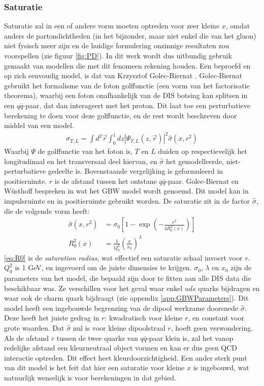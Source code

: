 \documentclass[a4paper,11pt]{article}
\numberwithin{equation}{section} %
\begin{document}
    \subsubsection{Saturatie} \label{sec:Saturatie}
Saturatie zal in een of andere vorm moeten optreden voor zeer kleine $x$, omdat anders de partondichtheden (in het bijzonder, maar niet enkel die van het gluon) niet fysisch meer zijn en de huidige formulering onzinnige resultaten zou voorspellen (zie figuur \ref{fig:PD}).
In dit werk wordt dus uitbundig gebruik gemaakt van modellen die met dit fenomeen rekening houden.
Een beproefd en op zich eenvoudig model, is dat van Krzysztof Golec-Biernat \cite{GB}.
Golec-Biernat gebruikt het formalisme van de foton golffunctie (een vorm van het factorisatie theorema), waarbij een foton onafhankelijk van de DIS botsing kan splitsen in een $q\bar{q}$-paar, dat dan interageert met het proton.
Dit laat toe een perturbatieve berekening te doen voor deze golffunctie, en de rest wordt beschreven door middel van een model.
\begin{align}
\sigma_{T,L} = \int d^2 \vec{r} \int_0^1 dz |\Psi_{T,L} (z, \vec{r})|^2 \hat{\sigma} (x,r^2)
\end{align}
Waarbij $\Psi$ de golffunctie van het foton is, $T$ en $L$ duiden op respectievelijk het longitudinaal en het transversaal deel hiervan, en $\hat{\sigma}$ het gemodelleerde, niet-perturbatieve gedeelte is.
Bovenstaande vergelijking is geformuleerd in positieruimte.
$r$ is de afstand tussen het ontstane $q\bar{q}$-paar.
Golec-Biernat en Wüsthoff bespreken in \cite{GBW} wat het GBW model wordt genoemd.
Dit model kan in impulsruimte en in positieruimte gebruikt worden.
De saturatie zit in de factor $\hat{\sigma}$, die de volgende vorm heeft:
\begin{align}
\hat{\sigma}(x,r^2) &= \sigma_0 \left[ 1- \exp{\left(-\frac{r^2}{4 R_0^2(x)}\right)} \right] \\
R_0^2(x) &= \frac{1}{Q_0^2} \left( \frac{x}{x_0} \right)^\lambda \label{eq:R0}
\end{align}
\eqref{eq:R0} is de \textit{saturation radius}, wat effectief een saturatie schaal invoert voor $r$.
$Q_0^2$ is 1 GeV, en ingevoerd om de juiste dimensies te krijgen.
$\sigma_0$, $\lambda$ en $x_0$ zijn de parameters van het model, die bepaald zijn door te fitten aan alle DIS data die beschikbaar was.
Ze verschillen voor het geval waar enkel $uds$ quarks bijdragen en waar ook de charm quark bijdraagt (zie appendix \ref{app:GBWParameters}).
Dit model heeft een ingebouwde begrenzing van de dipool werkzame doorsnede $\hat{\sigma}$.
Deze heeft het juiste gedrag in $r$: kwadratisch voor kleine $r$, en constant voor grote waarden.
Dat $\hat{\sigma}$ nul is voor kleine dipoolstraal $r$, hoeft geen verwondering.
Als de afstand $r$ tussen de twee quarks van $q\bar{q}$-paar klein is, zal het vanop redelijke afstand een kleurneutraal object vormen en kan er dus geen QCD interactie optreden.
Dit effect heet kleurdoorzichtigheid.
Een ander sterk punt van dit model is het feit dat hier een saturatie voor kleine $x$ is ingebouwd, wat natuurlijk wenselijk is voor berekeningen in dat gebied.
\end{document}
